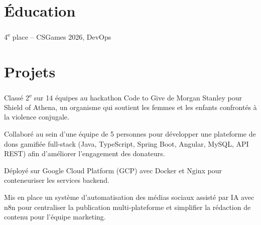 \documentclass[letterpaper,10pt]{article}
\begin{document}


\section{Éducation}

\vspace{-4pt}
\begin{resume_list}
\item 4\textsuperscript{e} place -- CSGames 2026, DevOps
\end{resume_list}
\vspace{-4pt}

\section{Projets}

\begin{resume_list}
\item Classé 2\textsuperscript{e} sur 14 équipes au hackathon Code to Give de Morgan Stanley pour Shield of Athena, un organisme qui soutient les femmes et les enfants confrontés à la violence conjugale.
\item Collaboré au sein d'une équipe de 5 personnes pour développer une plateforme de dons gamifiée full-stack (Java, TypeScript, Spring Boot, Angular, MySQL, API REST) afin d'améliorer l'engagement des donateurs.
\item Déployé sur Google Cloud Platform (GCP) avec Docker et Nginx pour conteneuriser les services backend.
\item Mis en place un système d'automatisation des médias sociaux assisté par IA avec n8n pour centraliser la publication multi-plateforme et simplifier la rédaction de contenu pour l'équipe marketing.
\end{resume_list}
\end{document}
